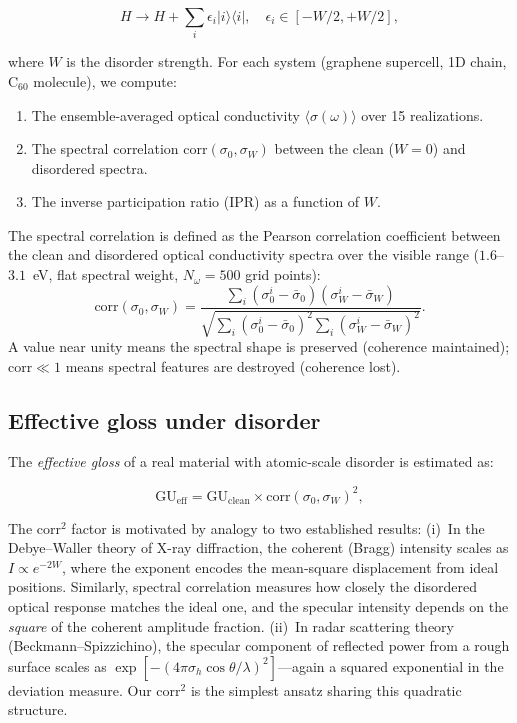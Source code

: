 \documentclass[twocolumn,showpacs,preprintnumbers,amsmath,amssymb,prb]{revtex4-2}
\begin{document}
\begin{equation}
  H \to H + \sum_i \epsilon_i |i\rangle\langle i|,
  \quad \epsilon_i \in [-W/2, +W/2],
  \label{eq:anderson}
\end{equation}

\noindent where $W$ is the disorder strength. For each system (graphene
supercell, 1D chain, C$_{60}$ molecule), we compute:

\begin{enumerate}
  \item The ensemble-averaged optical conductivity $\langle\sigma(\omega)\rangle$
    over 15 realizations.
  \item The spectral correlation $\mathrm{corr}(\sigma_0, \sigma_W)$
    between the clean ($W=0$) and disordered spectra.
  \item The inverse participation ratio (IPR) as a function of $W$.
\end{enumerate}

The spectral correlation is defined as the Pearson correlation
coefficient between the clean and disordered optical conductivity
spectra over the visible range ($1.6$--$3.1$~eV, flat spectral
weight, $N_\omega = 500$ grid points):
\begin{equation}
  \mathrm{corr}(\sigma_0, \sigma_W) =
  \frac{\sum_i (\sigma_0^i - \bar{\sigma}_0)
        (\sigma_W^i - \bar{\sigma}_W)}
  {\sqrt{\sum_i (\sigma_0^i - \bar{\sigma}_0)^2
         \sum_i (\sigma_W^i - \bar{\sigma}_W)^2}}.
  \label{eq:corr}
\end{equation}
A value near unity means the spectral shape is preserved
(coherence maintained); $\mathrm{corr} \ll 1$ means spectral
features are destroyed (coherence lost).

\subsection{Effective gloss under disorder}

The \emph{effective gloss} of a real material with atomic-scale disorder
is estimated as:

\begin{equation}
  \mathrm{GU}_\mathrm{eff} = \mathrm{GU}_\mathrm{clean} \times
    \mathrm{corr}(\sigma_0, \sigma_W)^2,
  \label{eq:eff_gloss}
\end{equation}

\noindent The $\mathrm{corr}^2$ factor is motivated by analogy to two
established results: (i)~In the Debye--Waller theory of X-ray diffraction,
the coherent (Bragg) intensity scales as $I \propto e^{-2W}$, where the
exponent encodes the mean-square displacement from ideal positions.
Similarly, spectral correlation measures how closely the disordered
optical response matches the ideal one, and the specular intensity
depends on the \emph{square} of the coherent amplitude fraction.
(ii)~In radar scattering theory (Beckmann--Spizzichino), the specular
component of reflected power from a rough surface scales as
$\exp[-(4\pi\sigma_h\cos\theta/\lambda)^2]$---again a squared
exponential in the deviation measure. Our $\mathrm{corr}^2$ is the
simplest ansatz sharing this quadratic structure.
\end{document}
